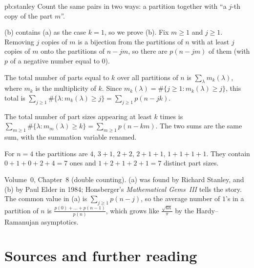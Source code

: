 \begin{solution}{pb:stanley}
\idea Count the same pairs in two ways: a partition together with ``a $j$-th copy of the part $m$''.

\writeup (b) contains (a) as the case $k=1$, so we prove (b). Fix $m\ge1$ and $j\ge1$. Removing $j$ copies of $m$ is a bijection
from the partitions of $n$ with at least $j$ copies of $m$ onto the partitions of $n-jm$, so there are $p(n-jm)$ of them (with
$p$ of a negative number equal to $0$).

The total number of parts equal to $k$ over all partitions of $n$ is $\sum_\lambda m_k(\lambda)$, where $m_k$ is the multiplicity of $k$.
Since $m_k(\lambda)=\#\{j\ge1:m_k(\lambda)\ge j\}$, this total is $\sum_{j\ge1}\#\{\lambda:m_k(\lambda)\ge j\}=\sum_{j\ge1}p(n-jk)$.

The total number of part sizes appearing at least $k$ times is $\sum_{m\ge1}\#\{\lambda:m_m(\lambda)\ge k\}=\sum_{m\ge1}p(n-km)$. The two
sums are the same sum, with the summation variable renamed.

For $n=4$ the partitions are $4$, $3+1$, $2+2$, $2+1+1$, $1+1+1+1$. They contain $0+1+0+2+4=7$ ones and $1+2+1+2+1=7$
distinct part sizes.

\tools Volume~0, Chapter~8 (double counting).
\leads (a) was found by Richard Stanley, and (b) by Paul Elder in 1984; Honsberger's \emph{Mathematical Gems~III} tells the
story. The common value in (a) is $\sum_{j\ge1}p(n-j)$, so the average number of $1$'s in a partition of $n$ is
$\frac{p(0)+\dots+p(n-1)}{p(n)}$, which grows like $\frac{\sqrt{6n}}\pi$ by the Hardy--Ramanujan asymptotics.
\end{solution}

\section*{Sources and further reading}

